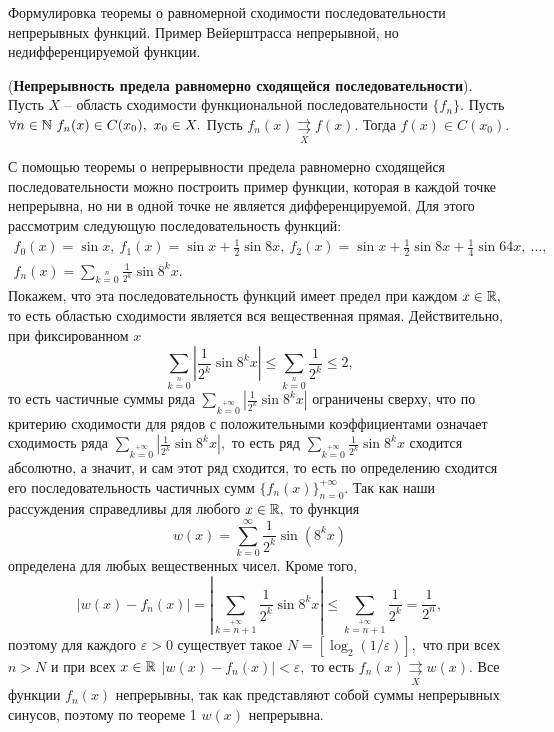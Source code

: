 \newpage
\begin{problem}
Формулировка теоремы о равномерной сходимости последовательности непрерывных
функций. Пример Вейерштрасса непрерывной, но недифференцируемой функции.
\end{problem}
\begin{theorem} (\textbf{Непрерывность предела
        равномерно сходящейся последовательности}).
    Пусть $X$ -- область сходимости
    функциональной последовательности
    $\{f_n\}.$
    Пусть $\forall n \in \N \ f_n(x) \in C(x_0), \ x_0\in X.$
    Пусть $f_n(x) \underset{X}\rightrightarrows f(x).$
    Тогда $f(x) \in C(x_0).$
\end{theorem}
С помощью теоремы о непрерывности предела равномерно
сходящейся последовательности можно построить пример
функции, которая в каждой точке непрерывна,
но ни в одной точке не является дифференцируемой.
Для этого рассмотрим следующую последовательность
функций:
\begin{multline*}
    f_0(x) = \sin x, \ f_1(x) = \sin x + \frac{1}{2} \sin 8x,
    \ f_2(x) = \sin x + \frac{1}{2} \sin 8x +
    \frac{1}{4} \sin 64x, \ ...,\\
    f_n(x) = \sum\limits_{k=0}\limits^{n}\frac{1}{2^k} \sin 8^k x.
\end{multline*}
Покажем, что эта последовательность функций имеет предел
при каждом $x\in\mathbb{R},$ то есть областью сходимости
является вся вещественная прямая.
Действительно, при фиксированном $x$
$$
    \sum\limits_{k=0}\limits^{n}\left|\frac{1}{2^k}
    \sin 8^k x\right|\leq
    \sum\limits_{k=0}\limits^{n}\frac{1}{2^k}\leq2,
$$
то есть частичные суммы ряда
$\sum\limits_{k=0}\limits^{+\infty}
    \left|\frac{1}{2^k} \sin 8^k x\right|$ ограничены
сверху, что по критерию сходимости для рядов
с положительными коэффициентами означает
сходимость ряда $\sum\limits_{k=0}
    \limits^{+\infty}\left|\frac{1}{2^k} \sin 8^k x\right|,$
то есть ряд $\sum\limits_{k=0}\limits^{+\infty}
    \frac{1}{2^k} \sin 8^k x$ сходится абсолютно, а значит,
и сам этот ряд сходится, то есть по определению
сходится его последовательность частичных сумм
$\{f_n(x)\}_{n=0}^{+\infty}.$
Так как наши рассуждения справедливы для любого
$x\in\mathbb{R},$ то функция
$$
    w(x) = \sum_{k=0}^\infty \frac{1}{2^k} \sin (8^k x)
$$
определена для любых вещественных чисел.
Кроме того,
$$
    |w(x)-f_n(x)|=\left|\sum\limits_{k=n+1}\limits^{+\infty}
    \frac{1}{2^k} \sin 8^k x\right|\leq
    \sum\limits_{k=n+1}\limits^{+\infty}
    \frac{1}{2^k}=\frac{1}{2^n},
$$
поэтому для каждого $\varepsilon>0$
существует такое $N=[\log_2(1/\varepsilon)],$
что при всех $n>N$ и при всех $x\in\mathbb{R}$
$|w(x)-f_n(x)|<\varepsilon,$ то есть
$f_n(x) \underset{X}\rightrightarrows w(x).$
Все функции $f_n(x)$ непрерывны, так как
представляют собой суммы непрерывных синусов,
поэтому по теореме 1 $w(x)$ непрерывна.

